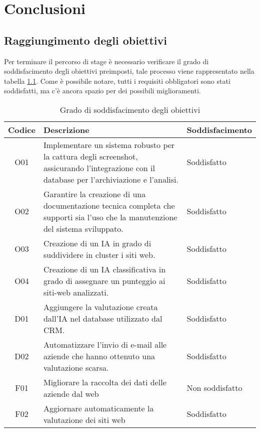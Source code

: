 \chapter{Conclusioni}
\label{cap:conclusioni}

\section{Raggiungimento degli obiettivi}
Per terminare il percorso di stage è necessario verificare il grado di soddisfacimento degli obiettivi preimposti, tale processo viene rappresentato nella tabella \ref{soddisfazione}.
Come è possibile notare, tutti i requisiti obbligatori sono stati soddisfatti, ma c'è ancora spazio per dei possibili miglioramenti.

\begin{table}[!htbp]
    \centering
    \begin{tabularx}{0.8\textwidth}{|c|X|X|}
    \hline
    \textbf{Codice} & \textbf{Descrizione} & \textbf{Soddisfacimento}\\
    \hline
    O01 & Implementare un sistema robusto per la cattura degli screenshot, assicurando l’integrazione con il database per l’archiviazione e l’analisi. & Soddisfatto\\
    \hline
    O02 & Garantire la creazione di una documentazione tecnica completa che supporti sia l’uso che la manutenzione  del sistema sviluppato. & Soddisfatto\\
    \hline
    O03 & Creazione di un IA in grado di suddividere in cluster i siti web. & Soddisfatto\\
    \hline
    O04 & Creazione di un IA classificativa in grado di assegnare un punteggio ai siti-web analizzati. & Soddisfatto\\
    \hline
    D01 & Aggiungere la valutazione creata dall'IA nel database utilizzato dal CRM. & Soddisfatto\\
    \hline
    D02 & Automatizzare l'invio di e-mail alle aziende che hanno ottenuto una valutazione scarsa. & Soddisfatto\\
    \hline
    F01 & Migliorare la raccolta dei dati delle aziende dal web & Non soddisfatto\\
    \hline
    F02 & Aggiornare automaticamente la valutazione dei siti web & Soddisfatto\\
    \hline
    \end{tabularx}
    \caption{Grado di soddisfacimento degli obiettivi}
    \label{soddisfazione}
\end{table}

